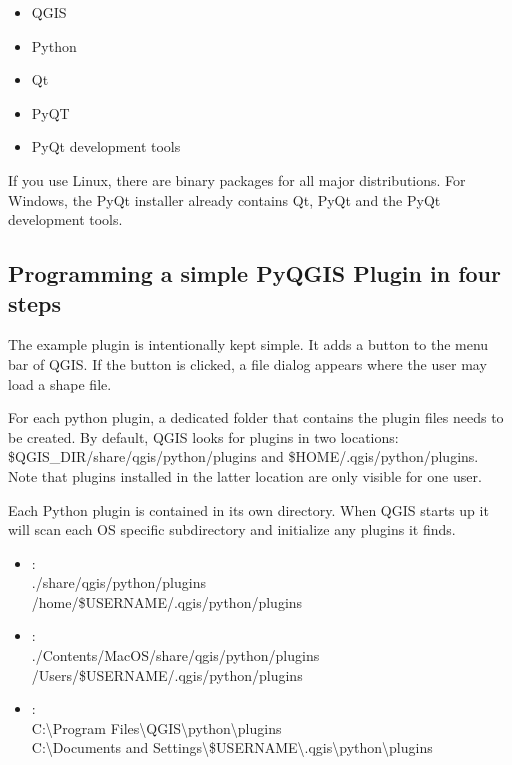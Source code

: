 \begin{itemize}
\item QGIS
\item Python
\item Qt
\item PyQT
\item PyQt development tools
\end{itemize}

If you use Linux, there are binary packages for all major distributions. For
Windows, the PyQt installer already contains Qt, PyQt and the PyQt
development tools.

\subsection{Programming a simple PyQGIS Plugin in four steps}\label{subsec:pyfoursteps}

The example plugin is intentionally kept simple. It adds a button to the menu
bar of QGIS. If the button is clicked, a file dialog appears where the user
may load a shape file.

For each python plugin, a dedicated folder that contains the plugin files
needs to be created. By default, QGIS looks for plugins in
two locations: \$QGIS\_DIR/share/qgis/python/plugins and \$HOME/.qgis/python/plugins.
Note that plugins installed in the latter location are only visible for one user.


Each Python plugin is contained in its own directory. When QGIS starts up it
will scan each OS specific subdirectory and initialize any plugins it finds. 

\begin{itemize}
\item {}:\\
./share/qgis/python/plugins \\
/home/\$USERNAME/.qgis/python/plugins
\item {}:\\
./Contents/MacOS/share/qgis/python/plugins \\
/Users/\$USERNAME/.qgis/python/plugins
\item {}:\\
C:\textbackslash Program Files\textbackslash QGIS\textbackslash python\textbackslash plugins \\
C:\textbackslash Documents and Settings\textbackslash\$USERNAME\textbackslash .qgis\textbackslash python\textbackslash plugins

\end{itemize}

